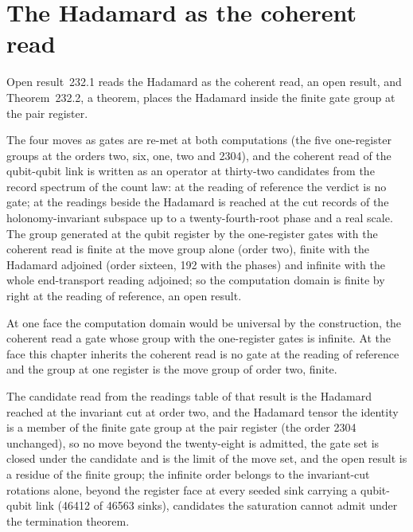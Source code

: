 \par\medskip{}\label{narr:close:13-2}\par
\section{The Hadamard as the coherent read}\label{mod:XIII-3-hadamard-as-the-coherent-read}
\label{narr:open:13-3}Open result~232.1 reads the Hadamard as the coherent read, an open result, and Theorem~232.2, a theorem, places the Hadamard inside the finite gate group at the pair register.
\begin{chwall}\label{box:XIII-3-hadamard-as-the-coherent-read:1}
The four moves as gates are re-met at both computations (the five one-register groups at the orders two, six, one, two and 2304), and the coherent read of the qubit-qubit link is written as an operator at thirty-two candidates from the record spectrum of the count law: at the reading of reference the verdict is no gate; at the readings beside the Hadamard is reached at the cut records of the holonomy-invariant subspace up to a twenty-fourth-root phase and a real scale. The group generated at the qubit register by the one-register gates with the coherent read is finite at the move group alone (order two), finite with the Hadamard adjoined (order sixteen, 192 with the phases) and infinite with the whole end-transport reading adjoined; so the computation domain is finite by right at the reading of reference, an open result.
\end{chwall}
At one face the computation domain would be universal by the construction, the coherent read a gate whose group with the one-register gates is infinite. At the face this chapter inherits the coherent read is no gate at the reading of reference and the group at one register is the move group of order two, finite.
\begin{chtheorem}\label{box:XIII-3-hadamard-as-the-coherent-read:2}
The candidate read from the readings table of that result is the Hadamard reached at the invariant cut at order two, and the Hadamard tensor the identity is a member of the finite gate group at the pair register (the order 2304 unchanged), so no move beyond the twenty-eight is admitted, the gate set is closed under the candidate and is the limit of the move set, and the open result is a residue of the finite group; the infinite order belongs to the invariant-cut rotations alone, beyond the register face at every seeded sink carrying a qubit-qubit link (46412 of 46563 sinks), candidates the saturation cannot admit under the termination theorem.
\end{chtheorem}
